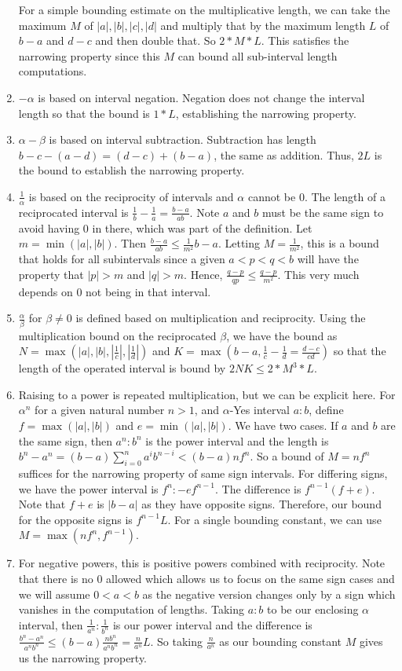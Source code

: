 \documentclass[12pt]{article}
\theoremstyle{remark}
\begin{document}
\begin{enumerate}
    For a simple bounding estimate on the multiplicative length, we can take the maximum $M$ of $|a|, |b|, |c|, |d|$ and multiply that by the maximum length $L$ of $b-a$ and $d-c$ and then double that. So $2*M*L$. This satisfies the narrowing property since this $M$ can bound all sub-interval length computations.
    \item $-\alpha$ is based on interval negation. Negation does not change the interval length so that the bound is $1*L$, establishing the narrowing property. 
    \item $\alpha - \beta$ is based on interval subtraction. Subtraction has length $b-c - (a-d) = (d-c) + (b-a)$, the same as addition. Thus, $2L$ is the bound to establish the narrowing property. 
    \item $\frac{1}{\alpha}$ is based on the reciprocity of intervals and $\alpha$ cannot be $0$. The length of a reciprocated interval is $\frac{1}{b} - \frac{1}{a} = \tfrac{b-a}{ab}$. Note $a$ and $b$ must be the same sign to avoid having 0 in there, which was part of the definition. Let $m = \min(|a|, |b|)$. Then $\tfrac{b-a}{ab} \leq \tfrac{1}{m^2} b-a$. Letting $M = \tfrac{1}{m^2}$, this is a bound that holds for all subintervals since a given $a < p < q < b$ will have the property that $|p| > m$ and $|q| > m$. Hence, $\frac{q-p}{qp} \leq \frac{q-p}{m^2}$. This very much depends on $0$ not being in that interval. 
    \item $\tfrac{\alpha}{\beta}$ for $\beta \neq 0$ is defined based on multiplication and reciprocity. Using the multiplication bound on the reciprocated $\beta$, we have the bound as $N = \max(|a|, |b|, |\frac{1}{c}|, |\frac{1}{d}|)$ and $K= \max(b-a, \frac{1}{c} - \frac{1}{d}= \tfrac{d-c}{cd} )$ so that the length of the operated interval is bound by $2NK \leq 2*M^3*L$.
    \item Raising to a power is repeated multiplication, but we can be explicit here. For $\alpha^n$ for a given natural number $n>1$, and $\alpha$-Yes interval $a:b$, define $f = \max(|a|, |b|)$ and $e=\min(|a|,|b|)$.  We have two cases. If $a$ and $b$ are the same sign, then $a^n:b^n$ is the power interval and the length is $b^n - a^n = (b-a)\sum_{i=0}^n a^i b^{n-i} < (b-a)n f^n$. So a bound of $M= nf^{n}$ suffices for the narrowing property of same sign intervals. For differing signs, we have the power interval is $f^n:-ef^{n-1}$. The difference is $f^{n-1} (f+e)$. Note that $f+e$ is $|b-a|$ as they have opposite signs. Therefore, our bound for the opposite signs is $f^{n-1} L$. For a single bounding constant, we can use $M = \max(n f^{n}, f^{n-1})$.
    \item For negative powers, this is positive powers combined with reciprocity. Note that there is no 0 allowed which allows us to focus on the same sign cases and we will assume $0 < a < b$ as the negative version changes only by a sign which vanishes in the computation of lengths.  Taking $a:b$ to be our enclosing $\alpha$ interval, then $\frac{1}{a^n} : \frac{1}{b^n}$ is our power interval and the difference is $\frac{b^n-a^n}{a^n b^n} \leq (b-a) \frac{n b^n}{a^n b^n} = \frac{n}{a^n} L$. So taking $\frac{n}{a^n}$ as our bounding constant $M$ gives us the narrowing property. 
\end{enumerate}
\end{document}
